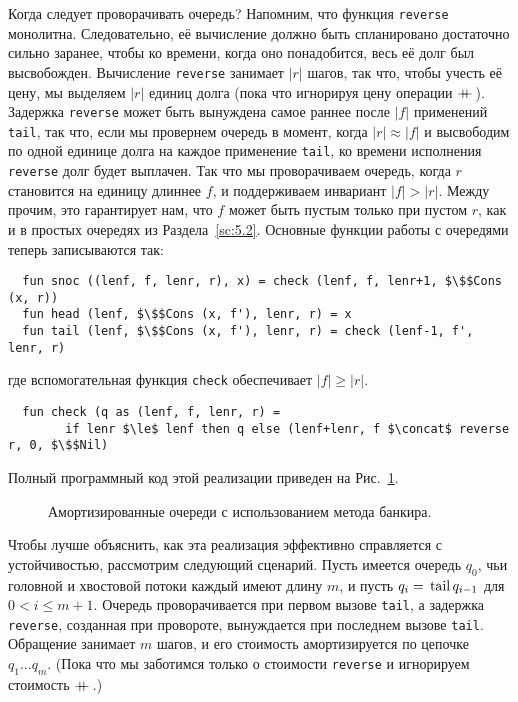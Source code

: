 Когда следует проворачивать очередь? Напомним, что функция
\lstinline!reverse! монолитна. Следовательно, её вычисление должно
быть спланировано достаточно сильно заранее, чтобы ко времени, когда
оно понадобится, весь её долг был высвобожден. Вычисление
\lstinline!reverse! занимает $|r|$ шагов, так что, чтобы учесть её
цену, мы выделяем $|r|$ единиц долга (пока что игнорируя цену
операции $+\!\!\!+\,$). Задержка \lstinline!reverse! может быть вынуждена
самое раннее после $|f|$ применений \lstinline!tail!, так что, если мы
провернем очередь в момент, когда $|r| \approx |f|$ и высвободим по
одной единице долга на каждое применение \lstinline!tail!, ко времени
исполнения \lstinline!reverse! долг будет выплачен.  Так что мы
проворачиваем очередь, когда $r$ становится на единицу длиннее $f$, и
поддерживаем инвариант $|f| > |r|$. Между прочим, это гарантирует нам,
что $f$ может быть пустым только при пустом $r$, как и в простых
очередях из Раздела~\ref{sc:5.2}. Основные функции работы с очередями
теперь записываются так:
\begin{lstlisting}
  fun snoc ((lenf, f, lenr, r), x) = check (lenf, f, lenr+1, $\$$Cons (x, r))
  fun head (lenf, $\$$Cons (x, f'), lenr, r) = x
  fun tail (lenf, $\$$Cons (x, f'), lenr, r) = check (lenf-1, f', lenr, r)
\end{lstlisting}
где вспомогательная функция \lstinline!check! обеспечивает $|f| \ge |r|$.
\begin{lstlisting}
  fun check (q as (lenf, f, lenr, r) =
        if lenr $\le$ lenf then q else (lenf+lenr, f $\concat$ reverse r, 0, $\$$Nil)
\end{lstlisting}
Полный программный код этой реализации приведен на Рис.~\ref{fig:6.1}.
\begin{figure}
  \centering
  
  \caption{Амортизированные очереди с использованием метода банкира.}
  \label{fig:6.1}
\end{figure}

Чтобы лучше объяснить, как эта реализация эффективно справляется с
устойчивостью, рассмотрим следующий сценарий. Пусть имеется очередь
$q_0$, чьи головной и хвостовой потоки каждый имеют длину $m$, и пусть
$q_i = \lstinline!tail! q_{i-1}$ для $0 < i \le m+1$. Очередь
проворачивается при первом вызове \lstinline!tail!, а задержка
\lstinline!reverse!, созданная при провороте, вынуждается при последнем
вызове \lstinline!tail!. Обращение занимает $m$ шагов, и его стоимость
амортизируется по цепочке $q_1\ldots q_m$. (Пока что мы заботимся
только о стоимости \lstinline!reverse! и игнорируем стоимость
$+\!\!\!+\,$.)

